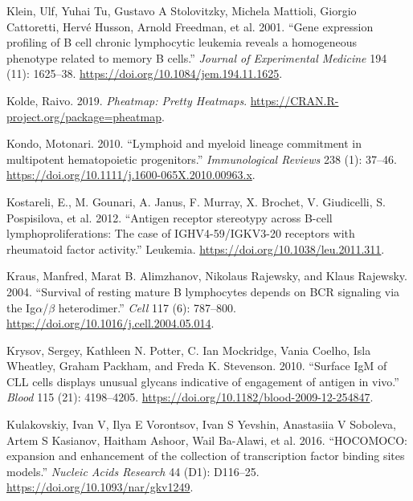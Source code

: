 \documentclass[11pt, a4paper, twosided]{book}
\newenvironment{CSLReferences}%
  {}%
  {\par}
\begin{document}
\begin{CSLReferences}{1}{0}
\leavevmode{}%
Klein, Ulf, Yuhai Tu, Gustavo A Stolovitzky, Michela Mattioli, Giorgio Cattoretti, Hervé Husson, Arnold Freedman, et al. 2001. {``{Gene expression profiling of B cell chronic lymphocytic leukemia reveals a homogeneous phenotype related to memory B cells}.''} \emph{Journal of Experimental Medicine} 194 (11): 1625--38. \url{https://doi.org/10.1084/jem.194.11.1625}.

\leavevmode{}%
Kolde, Raivo. 2019. \emph{Pheatmap: Pretty Heatmaps}. \url{https://CRAN.R-project.org/package=pheatmap}.

\leavevmode{}%
Kondo, Motonari. 2010. {``{Lymphoid and myeloid lineage commitment in multipotent hematopoietic progenitors}.''} \emph{Immunological Reviews} 238 (1): 37--46. \url{https://doi.org/10.1111/j.1600-065X.2010.00963.x}.

\leavevmode{}%
Kostareli, E., M. Gounari, A. Janus, F. Murray, X. Brochet, V. Giudicelli, S. Pospisilova, et al. 2012. {``{Antigen receptor stereotypy across B-cell lymphoproliferations: The case of IGHV4-59/IGKV3-20 receptors with rheumatoid factor activity}.''} Leukemia. \url{https://doi.org/10.1038/leu.2011.311}.

\leavevmode{}%
Kraus, Manfred, Marat B. Alimzhanov, Nikolaus Rajewsky, and Klaus Rajewsky. 2004. {``{Survival of resting mature B lymphocytes depends on BCR signaling via the Ig\(\alpha\)/\(\beta\) heterodimer}.''} \emph{Cell} 117 (6): 787--800. \url{https://doi.org/10.1016/j.cell.2004.05.014}.

\leavevmode{}%
Krysov, Sergey, Kathleen N. Potter, C. Ian Mockridge, Vania Coelho, Isla Wheatley, Graham Packham, and Freda K. Stevenson. 2010. {``{Surface IgM of CLL cells displays unusual glycans indicative of engagement of antigen in vivo}.''} \emph{Blood} 115 (21): 4198--4205. \url{https://doi.org/10.1182/blood-2009-12-254847}.

\leavevmode{}%
Kulakovskiy, Ivan V, Ilya E Vorontsov, Ivan S Yevshin, Anastasiia V Soboleva, Artem S Kasianov, Haitham Ashoor, Wail Ba-Alawi, et al. 2016. {``{HOCOMOCO: expansion and enhancement of the collection of transcription factor binding sites models.}''} \emph{Nucleic Acids Research} 44 (D1): D116--25. \url{https://doi.org/10.1093/nar/gkv1249}.


\end{CSLReferences}
\end{document}
